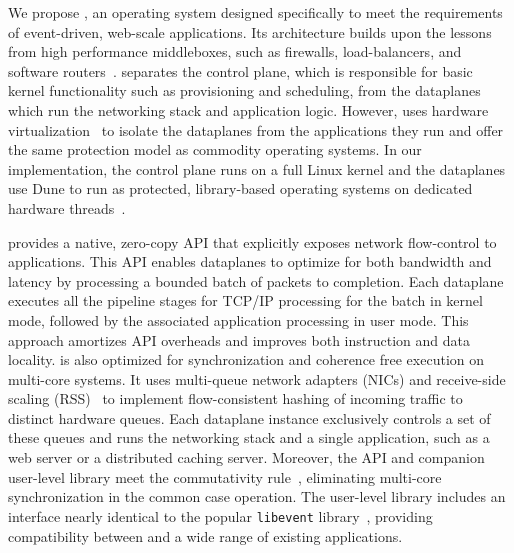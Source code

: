 We propose \ix, an operating system designed specifically to meet the
requirements of event-driven, web-scale applications.  Its
architecture builds upon the lessons from high performance
middleboxes, such as firewalls, load-balancers, and software
routers~\cite{DBLP:journals/tocs/KohlerMCJK00,DBLP:conf/sosp/DobrescuEACFIKMR09}. \ix
separates the control plane, which is responsible for basic kernel
functionality such as provisioning and scheduling, from the dataplanes
which run the networking stack and application logic. However, \ix
uses hardware
virtualization~\cite{DBLP:journals/computer/UhligNRSMABKLS05} to
isolate the dataplanes from the applications they run and offer the
same protection model as commodity operating systems. In our
implementation, the control plane runs on a full Linux kernel and the
dataplanes use Dune to run \ix as protected, library-based operating
systems on dedicated hardware
threads~\cite{DBLP:conf/osdi/BelayBMTMK12}.


\ix provides a native, zero-copy API that explicitly exposes network
flow-control to applications.  This API enables dataplanes to optimize
for both bandwidth and latency by processing a bounded batch of
packets to completion.  Each dataplane executes all the pipeline
stages for TCP/IP processing for the batch in kernel mode, followed by
the associated application processing in user mode. This approach
amortizes API overheads and improves both instruction and data
locality.  \ix is also optimized for synchronization and coherence
free execution on multi-core systems. It uses multi-queue network
adapters (NICs) and receive-side scaling (RSS)~\cite{url:rss} to
implement flow-consistent hashing of incoming traffic to distinct
hardware queues. Each dataplane instance exclusively controls a set of
these queues and runs the networking stack and a single application,
such as a web server or a distributed caching server. Moreover, the \ix
API and companion user-level library meet the commutativity
rule~\cite{DBLP:conf/sosp/ClementsKZMK13}, eliminating multi-core
synchronization in the common case operation. The \ix user-level
library includes an interface nearly identical to the popular
\texttt{libevent} library~\cite{provos2003libevent}, providing
compatibility between \ix and a wide range of existing applications.



